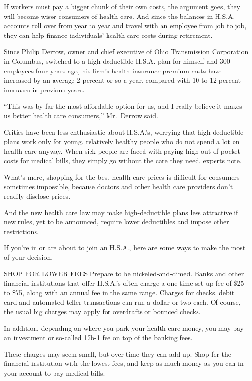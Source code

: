 ﻿\documentclass[12pt]{article}
\begin{document}
If workers must pay a bigger chunk of their own costs, the argument goes, they will become wiser
consumers of health care. And since the balances in H.S.A. accounts roll over from year to year and
travel with an employee from job to job, they can help finance individuals' health care costs during
retirement.

Since Philip Derrow, owner and chief executive of Ohio Transmission Corporation in Columbus,
switched to a high-deductible H.S.A. plan for himself and 300 employees four years ago, his firm's
health insurance premium costs have increased by an average 2 percent or so a year, compared with 10
to 12 percent increases in previous years.

``This was by far the most affordable option for us, and I really believe it makes us better health
care consumers,'' Mr.~Derrow said.

Critics have been less enthusiastic about H.S.A.'s, worrying that high-deductible plans work only
for young, relatively healthy people who do not spend a lot on health care anyway. When sick people
are faced with paying high out-of-pocket costs for medical bills, they simply go without the care
they need, experts note.

What's more, shopping for the best health care prices is difficult for consumers -- sometimes
impossible, because doctors and other health care providers don't readily disclose prices.

And the new health care law may make high-deductible plans less attractive if new rules, yet to be
announced, require lower deductibles and impose other restrictions.

If you're in or are about to join an H.S.A., here are some ways to make the most of your decision.

SHOP FOR LOWER FEES Prepare to be nickeled-and-dimed. Banks and other financial institutions that
offer H.S.A.'s often charge a one-time set-up fee of \$25 to \$75, along with an annual fee in the
same range. Charges for checks, debit card and automated teller transactions can run a dollar or two
each. Of course, the usual big charges may apply for overdrafts or bounced checks.

In addition, depending on where you park your health care money, you may pay an investment or
so-called 12b-1 fee on top of the banking fees.

These charges may seem small, but over time they can add up. Shop for the financial institution with
the lowest fees, and keep as much money as you can in your account to pay medical bills.
\end{document}
